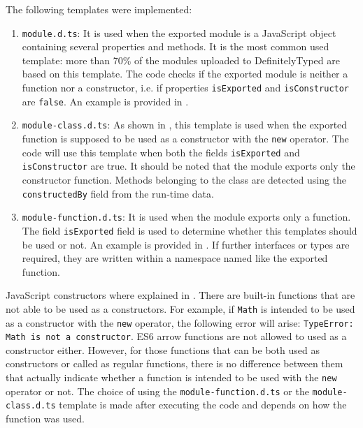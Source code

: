 The following templates were implemented:

\begin{enumerate}
  \item \texttt{module.d.ts}: It is used when the exported module is a JavaScript object containing several properties and methods. It is the most common used template: more than 70\% of the modules uploaded to DefinitelyTyped are based on this template. The code checks if the exported module is neither a function nor a constructor, i.e. if properties \texttt{isExported} and \texttt{isConstructor} are \texttt{false}. An example is provided in .

  \item \texttt{module-class.d.ts}: As shown in , this template is used when the exported function is supposed to be used as a constructor with the \texttt{new} operator. The code will use this template when both the fields \texttt{isExported} and \texttt{isConstructor} are true. It should be noted that the module exports only the constructor function. Methods belonging to the class are detected using the \texttt{constructedBy} field from the run-time data.
  
  \item \texttt{module-function.d.ts}: It is used when the module exports only a function. The field \texttt{isExported} field is used to determine whether this templates should be used or not. An example is provided in . If further interfaces or types are required, they are written within a namespace named like the exported function.
\end{enumerate}







JavaScript constructors where explained in . There are built-in functions that are not able to be used as a constructors. For example, if \texttt{Math} is intended to be used as a constructor with the \texttt{new} operator, the following error will arise: \texttt{TypeError: Math is not a constructor}. ES6 arrow functions are not allowed to used as a constructor either. However, for those functions that can be both used as constructors or called as regular functions, there is no difference between them that actually indicate whether a function is intended to be used with the \texttt{new} operator or not. The choice of using the \texttt{module-function.d.ts} or the \texttt{module-class.d.ts} template is made after executing the code and depends on how the function was used.

